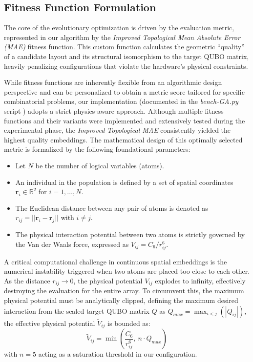 \subsection{Fitness Function Formulation}
\label{sec:fit_func}

The core of the evolutionary optimization is driven by the evaluation metric, represented in our algorithm by the \textit{Improved Topological Mean Absolute Error (MAE)} fitness function. This custom function calculates the geometric ``quality'' of a candidate layout and its structural isomorphism to the target QUBO matrix, heavily penalizing configurations that violate the hardware's physical constraints. 

While fitness functions are inherently flexible from an algorithmic design perspective and can be personalized to obtain a metric score tailored for specific combinatorial problems, our implementation (documented in the \textit{bench-GA.py} script \cite{orsucci_qubo_ga_quantum}) adopts a strict physics-aware approach. Although multiple fitness functions and their variants were implemented and extensively tested during the experimental phase, the \textit{Improved Topological MAE} consistently yielded the highest quality embeddings. 
The mathematical design of this optimally selected metric is formalized by the following foundational parameters:
\begin{itemize}
    \item Let $N$ be the number of logical variables (atoms).
    \item An individual in the population is defined by a set of spatial coordinates $\mathbf{r}_i \in \mathbb{R}^2$ for $i = 1, \dots, N$.
    \item The Euclidean distance between any pair of atoms is denoted as $r_{ij} = ||\mathbf{r}_i - \mathbf{r}_j||$ with $i \neq j$.
    \item The physical interaction potential between two atoms is strictly governed by the Van der Waals force, expressed as $V_{ij} = C_6 / r_{ij}^6$. 
\end{itemize}

A critical computational challenge in continuous spatial embeddings is the numerical instability triggered when two atoms are placed too close to each other. As the distance $r_{ij} \to 0$, the physical potential $V_{ij}$ explodes to infinity, effectively destroying the evaluation for the entire array. To circumvent this, the maximum physical potential must be analytically clipped, defining the maximum desired interaction from the scaled target QUBO matrix $Q$ as $Q_{max} = \max_{i<j}(|Q_{ij}|)$, the effective physical potential $\tilde{V}_{ij}$ is bounded as:
$$ \tilde{V}_{ij} = \min\left( \frac{C_6}{r_{ij}^6}, \ n \cdot Q_{max} \right) $$
with $n = 5$ acting as a saturation threshold in our configuration.

